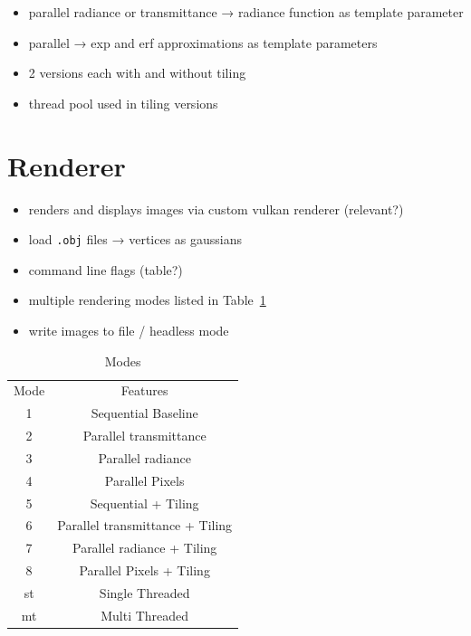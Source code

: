 \documentclass[a4paper, 11pt]{memoir}
\begin{document}
    \begin{itemize}
        \item parallel radiance or transmittance →  radiance function as template parameter
        \item parallel →  exp and erf approximations as template parameters
        \item 2 versions each with and without tiling
        \item thread pool used in tiling versions
    \end{itemize}

    \section{Renderer}
    \label{sec:renderer}

    \begin{itemize}
        \item renders and displays images via custom vulkan renderer (relevant?)
        \item load \texttt{.obj} files →  vertices as gaussians
        \item command line flags (table?)
        \item multiple rendering modes listed in Table~\ref{tab:exec_modes}
        \item write images to file / headless mode
    \end{itemize}

    \begin{table}[b]
        \centering
        \begin{tabular}{|c|c|}
            \hline
            Mode & Features\\
            1    & Sequential Baseline\\
            2    & Parallel \gls{transmittance}\\
            3    & Parallel \gls{radiance}\\
            4    & Parallel Pixels\\
            5    & Sequential + Tiling\\
            6    & Parallel \gls{transmittance} + Tiling\\
            7    & Parallel \gls{radiance} + Tiling\\
            8    & Parallel Pixels + Tiling\\
            st   & Single Threaded\\
            mt   & Multi Threaded\\
            \hline
        \end{tabular}
        \caption{Modes}
        \label{tab:exec_modes}
    \end{table}
    
\end{document}
